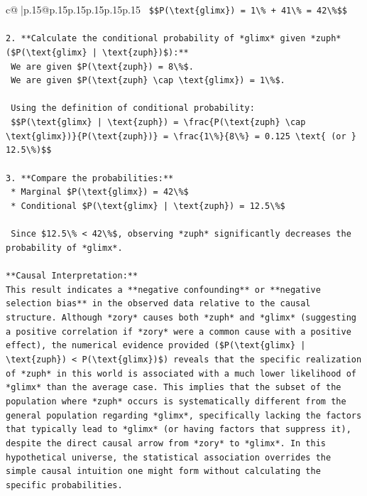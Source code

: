 \documentclass{article}
\begin{document}
{\begin{supertabular}{c@{$\;$}|p{.15\linewidth}@{}p{.15\linewidth}p{.15\linewidth}p{.15\linewidth}p{.15\linewidth}p{.15\linewidth}}
{{{\texttt{    \$\$P(\textbackslash{}text\{glimx\}) = 1\textbackslash{}\% + 41\textbackslash{}\% = 42\textbackslash{}\%\$\$} \\
\\ 
\texttt{2.  **Calculate the conditional probability of *glimx* given *zuph* (\$P(\textbackslash{}text\{glimx\} | \textbackslash{}text\{zuph\})\$):**} \\
\texttt{    We are given \$P(\textbackslash{}text\{zuph\}) = 8\textbackslash{}\%\$.} \\
\texttt{    We are given \$P(\textbackslash{}text\{zuph\} \textbackslash{}cap \textbackslash{}text\{glimx\}) = 1\textbackslash{}\%\$.} \\
\\ 
\texttt{    Using the definition of conditional probability:} \\
\texttt{    \$\$P(\textbackslash{}text\{glimx\} | \textbackslash{}text\{zuph\}) = \textbackslash{}frac\{P(\textbackslash{}text\{zuph\} \textbackslash{}cap \textbackslash{}text\{glimx\})\}\{P(\textbackslash{}text\{zuph\})\} = \textbackslash{}frac\{1\textbackslash{}\%\}\{8\textbackslash{}\%\} = 0.125 \textbackslash{}text\{ (or \} 12.5\textbackslash{}\%)\$\$} \\
\\ 
\texttt{3.  **Compare the probabilities:**} \\
\texttt{    *   Marginal \$P(\textbackslash{}text\{glimx\}) = 42\textbackslash{}\%\$} \\
\texttt{    *   Conditional \$P(\textbackslash{}text\{glimx\} | \textbackslash{}text\{zuph\}) = 12.5\textbackslash{}\%\$} \\
\\ 
\texttt{    Since \$12.5\textbackslash{}\% < 42\textbackslash{}\%\$, observing *zuph* significantly decreases the probability of *glimx*.} \\
\\ 
\texttt{**Causal Interpretation:**} \\
\texttt{This result indicates a **negative confounding** or **negative selection bias** in the observed data relative to the causal structure. Although *zory* causes both *zuph* and *glimx* (suggesting a positive correlation if *zory* were a common cause with a positive effect), the numerical evidence provided (\$P(\textbackslash{}text\{glimx\} | \textbackslash{}text\{zuph\}) < P(\textbackslash{}text\{glimx\})\$) reveals that the specific realization of *zuph* in this world is associated with a much lower likelihood of *glimx* than the average case. This implies that the subset of the population where *zuph* occurs is systematically different from the general population regarding *glimx*, specifically lacking the factors that typically lead to *glimx* (or having factors that suppress it), despite the direct causal arrow from *zory* to *glimx*. In this hypothetical universe, the statistical association overrides the simple causal intuition one might form without calculating the specific probabilities.} \\
}}}
\end{supertabular}}
\end{document}
